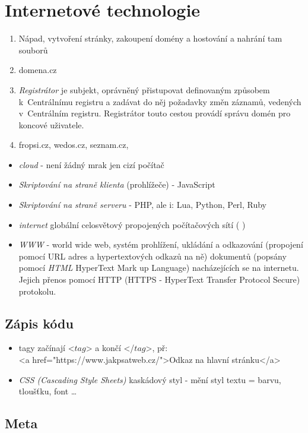 \documentclass[12pt]{article}
\begin{document}
\section{Internetové technologie}
\begin{enumerate}
\item Nápad, vytvoření stránky, zakoupení domény a hostování a nahrání tam souborů
\item domena.cz
\item \emph{Registrátor} je subjekt, oprávněný přistupovat definovaným způsobem k~Centrálnímu registru a zadávat do něj požadavky změn záznamů, vedených v~Centrálním registru. Registrátor touto cestou provádí správu domén pro koncové uživatele.
\item fropsi.cz, wedos.cz, seznam.cz, 
\end{enumerate}
\begin{itemize}
\label{sec:internet_technologie}
\item \emph{cloud} - není žádný mrak jen cizí počítač
\item \emph{Skriptování na straně klienta} (prohlížeče) - JavaScript
\item \emph{Skriptování na straně serveru} - PHP, ale i:  Lua, Python, Perl, Ruby
\item \emph{internet} globální celosvětový propojených počítačových sítí ( )
\item \emph{WWW} - world wide web, systém prohlížení, ukládání a odkazování (propojení pomocí URL adres a hypertextových odkazů na ně) dokumentů (popsány pomocí \emph{HTML} HyperText Mark up Language) nacházejících se na internetu. Jejich přenos pomocí HTTP (HTTPS - HyperText Transfer Protocol Secure) protokolu.
\end{itemize}
\subsection{Zápis kódu}
\begin{itemize}
\item tagy začínají <$tag$> a končí </$tag$>, př:\\
<a href="https://www.jakpsatweb.cz/">Odkaz na hlavní stránku</a>
\item \emph{CSS (Cascading Style Sheets)} kaskádový styl - mění styl textu = barvu, tloušťku, font \dots
\end{itemize}
\subsection{Meta}
\end{document}
